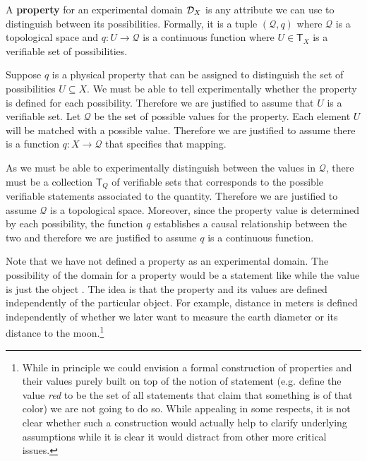 \documentclass[11pt,letterpaper,fleqn]{memoir} %
\begin{document}
\begin{mathSection}
	\begin{defn}
		A \textbf{property} for an experimental domain $\mathcal{D}_X$ is any attribute we can use to distinguish between its possibilities. Formally, it is a tuple $(\mathcal{Q}, q)$ where $\mathcal{Q}$ is a topological space and $q : U \to \mathcal{Q}$ is a continuous function where $U \in \mathsf{T}_X$ is a verifiable set of possibilities.
	\end{defn}
	\begin{justification}
		Suppose $q$ is a physical property that can be assigned to distinguish the set of possibilities $U \subseteq X$. We must be able to tell experimentally whether the property is defined for each possibility. Therefore we are justified to assume that $U$ is a verifiable set. Let $\mathcal{Q}$ be the set of possible values for the property. Each element $U$ will be matched with a possible value. Therefore we are justified to assume there is a function $q : X \to \mathcal{Q}$ that specifies that mapping.
		
		As we must be able to experimentally distinguish between the values in $\mathcal{Q}$, there must be a collection $\mathsf{T}_Q$ of verifiable sets that corresponds to the possible verifiable statements associated to the quantity. Therefore we are justified to assume $\mathcal{Q}$ is a topological space. Moreover, since the property value is determined by each possibility, the function $q$ establishes a causal relationship between the two and therefore we are justified to assume $q$ is a continuous function.
	\end{justification}
\end{mathSection}
		
Note that we have not defined a property as an experimental domain. The possibility of the domain for a property would be a statement like  while the value is just the object . The idea is that the property and its values are defined independently of the particular object. For example, distance in meters is defined independently of whether we later want to measure the earth diameter or its distance to the moon.\footnote{While in principle we could envision a formal construction of properties and their values purely built on top of the notion of statement (e.g. define the value \emph{red} to be the set of all statements that claim that something is of that color) we are not going to do so. While appealing in some respects, it is not clear whether such a construction would actually help to clarify underlying assumptions while it is clear it would distract from other more critical issues.}
\end{document}
